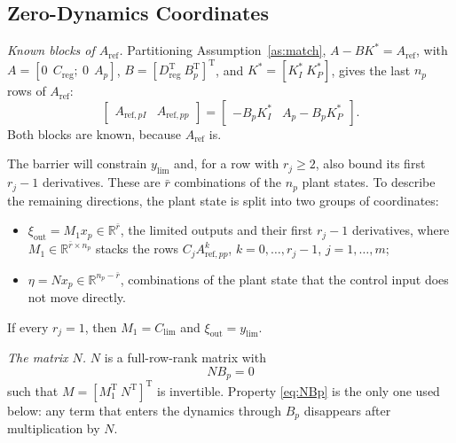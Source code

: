 \documentclass[lettersize,journal]{IEEEtran}
\newcommand{\Ar}{A_{\mathrm{ref}}}
\newcommand{\App}{A_{\mathrm{ref},pp}}
\newcommand{\Clim}{C_{\mathrm{lim}}}
\newcommand{\ylim}{y_{\mathrm{lim}}}
\newcommand{\Creg}{C_{\mathrm{reg}}}
\newcommand{\Dreg}{D_{\mathrm{reg}}}
\newcommand{\T}{\mathrm{T}}
\newcommand{\R}{\mathbb{R}}
\begin{document}
\subsection{Zero-Dynamics Coordinates} \label{sec:zerocoord}

\emph{Known blocks of $\Ar$.} Partitioning Assumption~\ref{as:match}, $A-BK^*=\Ar$, with $A=[0\ \ \Creg;\ 0\ \ A_p]$, $B=[\Dreg^\T\ B_p^\T]^\T$, and $K^*=[K_I^*\ K_P^*]$, gives the last $n_p$ rows of $\Ar$:
\begin{equation}
\begin{bmatrix}A_{\mathrm{ref},pI} & \App\end{bmatrix} = \begin{bmatrix}-B_pK_I^* & A_p-B_pK_P^*\end{bmatrix}. \label{eq:Arefblocks}
\end{equation}
Both blocks are known, because $\Ar$ is.

The barrier will constrain $\ylim$ and, for a row with $r_j\ge2$, also bound its first $r_j-1$ derivatives. These are $\bar r$ combinations of the $n_p$ plant states. To describe the remaining directions, the plant state is split into two groups of coordinates:
\begin{itemize}
\item $\xi_{\mathrm{out}}=M_1x_p\in\R^{\bar r}$, the limited outputs and their first $r_j-1$ derivatives, where $M_1\in\R^{\bar r\times n_p}$ stacks the rows $C_j\App^k$, $k=0,\dots,r_j-1$, $j=1,\dots,m$;
\item $\eta=Nx_p\in\R^{n_p-\bar r}$, combinations of the plant state that the control input does not move directly.
\end{itemize}
If every $r_j=1$, then $M_1=\Clim$ and $\xi_{\mathrm{out}}=\ylim$.

\emph{The matrix $N$.} $N$ is a full-row-rank matrix with
\begin{equation}
NB_p=0 \label{eq:NBp}
\end{equation}
such that $M=[M_1^\T\ N^\T]^\T$ is invertible. Property \eqref{eq:NBp} is the only one used below: any term that enters the dynamics through $B_p$ disappears after multiplication by $N$.
\end{document}
